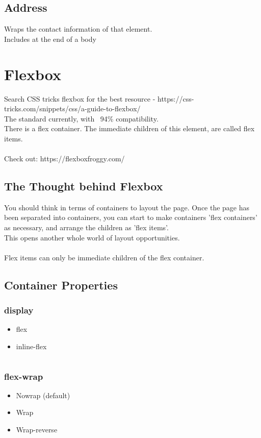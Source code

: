 \documentclass[]{article}
\begin{document}
\subsection{Address}
Wraps the contact information of that element.
\\
Includes at the end of a body 

\section{Flexbox}
Search CSS tricks flexbox for the best resource - https://css-tricks.com/snippets/css/a-guide-to-flexbox/
\\
The standard currently, with ~94\% compatibility.
\\
There is a flex container.  The immediate children of this element, are called flex items.
\\\\
Check out: https://flexboxfroggy.com/
\subsection{The Thought behind Flexbox}
You should think in terms of containers to layout the page.  Once the page has been separated into containers, you can start to make containers 'flex containers' as necessary, and arrange the children as 'flex items'.  
\\
This opens another whole world of layout opportunities.
\\\\
Flex items can only be immediate children of the flex container.

\subsection{Container Properties}
\subsubsection{display}
\begin{itemize}
	\item flex
	\item inline-flex
\end{itemize}
\begin{lstlisting}
\end{lstlisting}

\subsubsection{flex-wrap}
\begin{itemize}
	\item Nowrap (default)
	\item Wrap
	\item Wrap-reverse
\end{itemize}
\begin{lstlisting}
\end{lstlisting}
\end{document}
